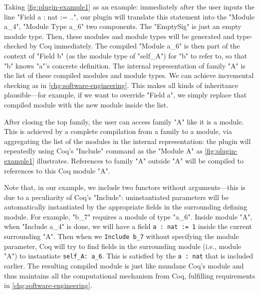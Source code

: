 Taking \cref{fig:plugin-example1} as an example: immediately after the user inputs the line "Field a : nat := ..", our plugin will
translate this statement into the "Module a_4", "Module Type a_6"
two components.
{The "EmptySig" is just an empty module type.} Then,
these modules and module types will be generated and type-checked by Coq
immediately. The compiled "Module a_6" is then part of the context of
"Field b" (as the module type of "self_A") for "b" to refer to, so that "b" knows "a"'s concrete definition. The
internal representation of family "A" is the list of these
compiled modules and module types. We can achieve incremental
checking as in \ref{chg:software-engineering}. This makes all kinds of inheritance plausible---for example, if we
want to override "Field a", we simply replace that compiled module with
the new module inside the list. 



After closing the top family, the user can access family "A" like it is a module. This is achieved by a complete compilation from a family to a module,
via aggregating the list of the modules in the internal representation:
the plugin will repeatedly using Coq's "Include" command as the "Module
A" as \cref{fig:plugin-example1} illustrates.
References to family "A" outside "A" will be compiled to references to
this Coq module "A".

Note that, in our example, we include two
functors without arguments---this is due to a peculiarity of Coq's
"Include": uninstantiated parameters will be automatically
instantiated by the appropriate fields in the surrounding defining
module.
For example, "b_7" requires a module of type "a_6". Inside module "A",
when "Include a_4" is done, we will have a field \texttt{a : nat := 1}
inside the current surrounding "A". Then when we
\texttt{Include b_7} without specifying the module parameter,
Coq will try to find fields in the surrounding module (i.e., module
"A") to instantiate \texttt{self_A: a_6}. This is satisfied by
the \texttt{a : nat} that is included earlier.
The resulting compiled module is just like mundane Coq's module and 
thus maintains all the computational mechanism from Coq, fulfilling
requirements in \ref{chg:software-engineering}.

